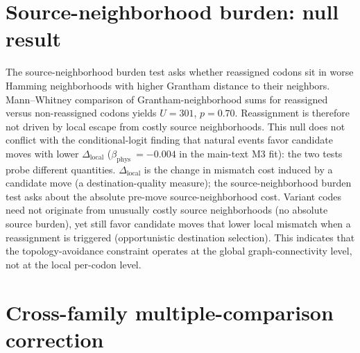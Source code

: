 \documentclass[preprint,11pt,authoryear,a4paper]{elsarticle}
\begin{document}
\section{Source-neighborhood burden: null result}\label{sec:s-infoneg}

The source-neighborhood burden test asks whether reassigned codons sit
in worse Hamming neighborhoods with higher Grantham distance to their
neighbors. Mann--Whitney comparison of Grantham-neighborhood sums for
reassigned versus non-reassigned codons yields \(U = 301\),
\(p = 0.70\). Reassignment is therefore not driven by local escape from
costly source neighborhoods. This null does not conflict with the
conditional-logit finding that natural events favor candidate moves with
lower \(\Delta_{\text{local}}\) (\(\beta_{\text{phys }} = - 0.004\) in
the main-text M3 fit): the two tests probe different quantities.
\(\Delta_{\text{local}}\) is the change in mismatch cost induced by a
candidate move (a destination-quality measure); the source-neighborhood
burden test asks about the absolute pre-move source-neighborhood cost.
Variant codes need not originate from unusually costly source
neighborhoods (no absolute source burden), yet still favor candidate
moves that lower local mismatch when a reassignment is triggered
(opportunistic destination selection). This indicates that the
topology-avoidance constraint operates at the global graph-connectivity
level, not at the local per-codon level.

\section{Cross-family multiple-comparison
correction}\label{sec:s-multicomp}
\end{document}
